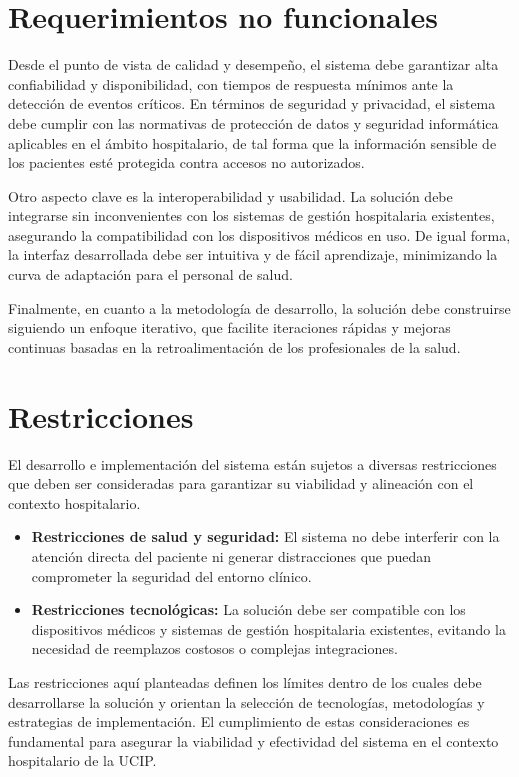 \section{Requerimientos no funcionales}

Desde el punto de vista de calidad y desempeño, el sistema debe garantizar alta confiabilidad y disponibilidad, con tiempos de respuesta mínimos ante la detección de eventos críticos. En términos de seguridad y privacidad, el sistema debe cumplir con las normativas de protección de datos y seguridad informática aplicables en el ámbito hospitalario, de tal forma que la información sensible de los pacientes esté protegida contra accesos no autorizados.

Otro aspecto clave es la interoperabilidad y usabilidad. La solución debe integrarse sin inconvenientes con los sistemas de gestión hospitalaria existentes, asegurando la compatibilidad con los dispositivos médicos en uso. De igual forma, la interfaz desarrollada debe ser intuitiva y de fácil aprendizaje, minimizando la curva de adaptación para el personal de salud.

Finalmente, en cuanto a la metodología de desarrollo, la solución debe construirse siguiendo un enfoque iterativo, que facilite iteraciones rápidas y mejoras continuas basadas en la retroalimentación de los profesionales de la salud.

\medskip

\section{Restricciones}

El desarrollo e implementación del sistema están sujetos a diversas restricciones que deben ser consideradas para garantizar su viabilidad y alineación con el contexto hospitalario.

\begin{itemize}

  \item \textbf{Restricciones de salud y seguridad:} El sistema no debe interferir con la atención directa del paciente ni generar distracciones que puedan comprometer la seguridad del entorno clínico.

  \item \textbf{Restricciones tecnológicas:} La solución debe ser compatible con los dispositivos médicos y sistemas de gestión hospitalaria existentes, evitando la necesidad de reemplazos costosos o complejas integraciones.

\end{itemize}

Las restricciones aquí planteadas definen los límites dentro de los cuales debe desarrollarse la solución y orientan la selección de tecnologías, metodologías y estrategias de implementación. El cumplimiento de estas consideraciones es fundamental para asegurar la viabilidad y efectividad del sistema en el contexto hospitalario de la UCIP.
